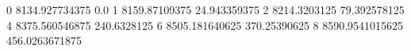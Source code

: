 0 8134.927734375 0.0
1 8159.87109375 24.943359375
2 8214.3203125 79.392578125
4 8375.560546875 240.6328125
6 8505.181640625 370.25390625
8 8590.9541015625 456.0263671875
